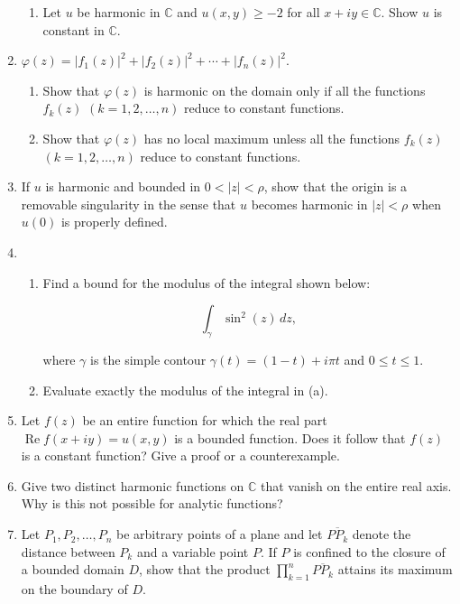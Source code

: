 \documentclass[a4paper,10pt]{article}
\renewcommand{\Re}{\operatorname{Re}}
\begin{document}
\begin{enumerate}
\begin{enumerate}
		\item Let $u$ be harmonic in $\mathbb{C}$ and $u(x,y)\ge-2$ for all $x+iy\in \mathbb{C}$. Show $u$ is constant in $\mathbb{C}$.
		\end{enumerate}
		
		\item $\varphi(z)=|f_{1}(z)|^{2}+|f_{2}(z)|^{2}+\cdots+|f_{n}(z)|^{2}$.
		
		\begin{enumerate}
			\item Show that $\varphi(z)$ is harmonic on the domain only if all the functions $f_{k}(z)$ $(k=1,2,\ldots,n)$ reduce to constant functions.
			\item Show that $\varphi(z)$ has no local maximum unless all the functions $f_{k}(z)$ $(k=1,2,\ldots,n)$ reduce to constant functions.
		\end{enumerate}
		
		\item  If $u$ is harmonic and bounded in $0<|z|<\rho$, show that the origin is a removable singularity in the sense that $u$ becomes harmonic in $|z|<\rho$ when $u(0)$ is properly defined.
		

		
		\item
		\begin{enumerate} 
			\item Find a bound for the modulus of the integral shown below:
		
		\[\int_{\gamma}\sin^{2}(z)\,dz,\]
		
		where $\gamma$ is the simple contour $\gamma(t)=(1-t)+i\pi t$ and $0\le t\le1$.
		
		\item Evaluate exactly the modulus of the integral in (a).
		\end{enumerate}
		
		\item Let $f(z)$ be an entire function for which the real part $\Re f(x+iy)=u(x,y)$ is a bounded function.
		Does it follow that $f(z)$ is a constant function? Give a proof or a counterexample.
		
		\item Give two distinct harmonic functions on $\mathbb{C}$ that vanish on the entire real axis. Why is this not possible for analytic functions?
		
		\item Let $P_{1},P_{2},\ldots,P_{n}$ be arbitrary points of a plane and let $\overline{PP_{k}}$ denote the distance between $P_{k}$ and a variable point $P$. If $P$ is confined to the closure of a bounded domain $D$, show that the product $\prod_{k=1}^{n}\overline{PP_{k}}$ attains its maximum on the boundary of $D$.
		

\end{enumerate}
\end{document}
